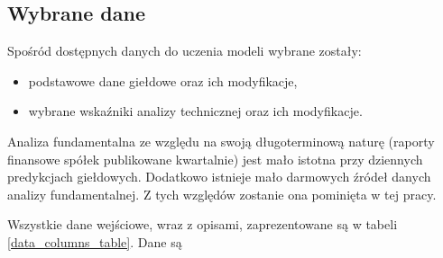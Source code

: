 \documentclass[a4paper, twoside, 11pt, openright]{article}
\begin{document}
\subsection{Wybrane dane}

Spośród dostępnych danych do uczenia modeli wybrane zostały: 
\begin{itemize}
\item podstawowe dane giełdowe oraz ich modyfikacje,
\item wybrane wskaźniki analizy technicznej oraz ich modyfikacje.
\end{itemize}

Analiza fundamentalna ze względu na swoją długoterminową naturę (raporty finansowe spółek publikowane kwartalnie) jest mało istotna przy dziennych predykcjach giełdowych. Dodatkowo istnieje mało darmowych źródeł danych analizy fundamentalnej. Z tych względów zostanie ona pominięta w tej pracy.

\bigskip

Wszystkie dane wejściowe, wraz z opisami, zaprezentowane są w tabeli \ref{data_columns_table}. Dane są 
\end{document}
